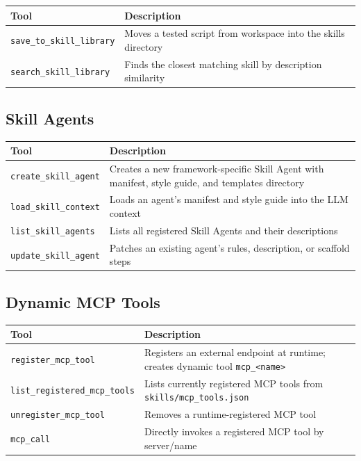 \documentclass[11pt,a4paper]{article}
\begin{document}
\begin{table}[h!]
\centering
\begin{tabular}{@{}lp{9cm}@{}}
\toprule
\textbf{Tool} & \textbf{Description} \\
\midrule
\texttt{save\_to\_skill\_library} & Moves a tested script from workspace into the skills directory \\
\texttt{search\_skill\_library} & Finds the closest matching skill by description similarity \\
\bottomrule
\end{tabular}
\end{table}

\subsection{Skill Agents}

\begin{table}[h!]
\centering
\begin{tabular}{@{}lp{9cm}@{}}
\toprule
\textbf{Tool} & \textbf{Description} \\
\midrule
\texttt{create\_skill\_agent} & Creates a new framework-specific Skill Agent with manifest, style guide, and templates directory \\
\texttt{load\_skill\_context} & Loads an agent's manifest and style guide into the LLM context \\
\texttt{list\_skill\_agents} & Lists all registered Skill Agents and their descriptions \\
\texttt{update\_skill\_agent} & Patches an existing agent's rules, description, or scaffold steps \\
\bottomrule
\end{tabular}
\end{table}

\subsection{Dynamic MCP Tools}

\begin{table}[h!]
\centering
\begin{tabular}{@{}lp{9cm}@{}}
\toprule
\textbf{Tool} & \textbf{Description} \\
\midrule
\texttt{register\_mcp\_tool} & Registers an external endpoint at runtime; creates dynamic tool \texttt{mcp\_<name>} \\
\texttt{list\_registered\_mcp\_tools} & Lists currently registered MCP tools from \texttt{skills/mcp\_tools.json} \\
\texttt{unregister\_mcp\_tool} & Removes a runtime-registered MCP tool \\
\texttt{mcp\_call} & Directly invokes a registered MCP tool by server/name \\
\bottomrule
\end{tabular}
\end{table}
\end{document}
